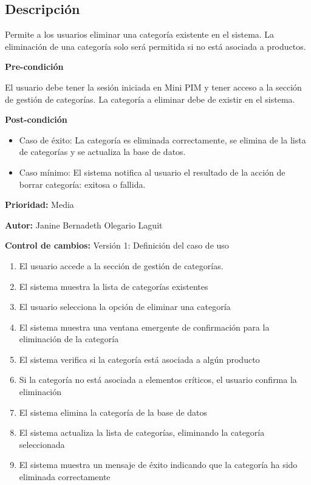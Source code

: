 
\subsection*{Descripción}
Permite a los usuarios eliminar una categoría existente en el sistema. La eliminación de una categoría solo será permitida si no está asociada a productos. \par
\vspace{0.15cm}

\textbf{Pre-condición}\par
El usuario debe tener la sesión iniciada en Mini PIM y tener acceso a la sección de gestión de categorías. La categoría a eliminar debe de existir en el sistema. \par
\vspace{0.15cm}

\textbf{Post-condición}
\begin{itemize}
    \item Caso de éxito: La categoría es eliminada correctamente, se elimina de la lista de categorías y se actualiza la base de datos.
    \item Caso mínimo: El sistema notifica al usuario el resultado de la acción de borrar categoría: exitosa o fallida.
\end{itemize}

\textbf{Prioridad: }
Media
\vspace{0.15cm}

\textbf{Autor: }
Janine Bernadeth Olegario Laguit\par
\vspace{0.15cm}

\textbf{Control de cambios: } Versión 1: Definición del caso de uso

\begin{enumerate}
    \item El usuario accede a la sección de gestión de categorías.
    \item El sistema muestra la lista de categorías existentes
    \item El usuario selecciona la opción de eliminar una categoría
    \item El sistema muestra una ventana emergente de confirmación para la eliminación de la categoría
    \item El sistema verifica si la categoría está asociada a algún producto
    \item Si la categoría no está asociada a elementos críticos, el usuario confirma la eliminación
    \item El sistema elimina la categoría de la base de datos
    \item El sistema actualiza la lista de categorías, eliminando la categoría seleccionada
    \item El sistema muestra un mensaje de éxito indicando que la categoría ha sido eliminada correctamente
\end{enumerate}

